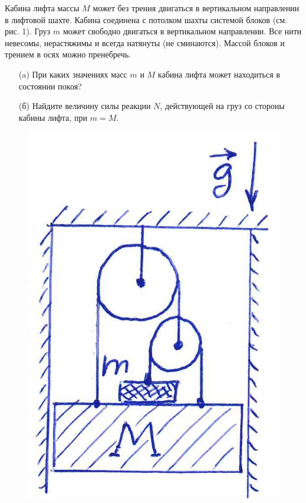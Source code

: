 \begin{prob}
Кабина лифта массы $M$ может без трения двигаться в вертикальном направлении в лифтовой шахте. Кабина соединена с потолком шахты системой блоков (см. рис. 1). Груз $m$ может свободно двигаться в вертикальном направлении. Все нити невесомы, нерастяжимы и всегда натянуты (не сминаются). Массой блоков и трением в осях можно пренебречь.
\begin{itemize}
\item[(a)] При каких значениях масс $m$ и $M$ кабина лифта может находиться в состоянии покоя?
\item[(б)] Найдите величину силы реакции $N$, действующей на груз со стороны кабины лифта, при $m=M$.
\end{itemize}
\begin{figure}[h!]
\includegraphics[scale=0.25]{IMG/img_1}
\end{figure}
\end{prob}

